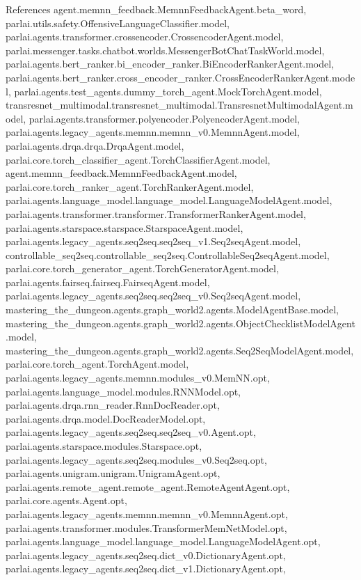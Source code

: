 References agent.\+memnn\+\_\+feedback.\+Memnn\+Feedback\+Agent.\+beta\+\_\+word, parlai.\+utils.\+safety.\+Offensive\+Language\+Classifier.\+model, parlai.\+agents.\+transformer.\+crossencoder.\+Crossencoder\+Agent.\+model, parlai.\+messenger.\+tasks.\+chatbot.\+worlds.\+Messenger\+Bot\+Chat\+Task\+World.\+model, parlai.\+agents.\+bert\+\_\+ranker.\+bi\+\_\+encoder\+\_\+ranker.\+Bi\+Encoder\+Ranker\+Agent.\+model, parlai.\+agents.\+bert\+\_\+ranker.\+cross\+\_\+encoder\+\_\+ranker.\+Cross\+Encoder\+Ranker\+Agent.\+model, parlai.\+agents.\+test\+\_\+agents.\+dummy\+\_\+torch\+\_\+agent.\+Mock\+Torch\+Agent.\+model, transresnet\+\_\+multimodal.\+transresnet\+\_\+multimodal.\+Transresnet\+Multimodal\+Agent.\+model, parlai.\+agents.\+transformer.\+polyencoder.\+Polyencoder\+Agent.\+model, parlai.\+agents.\+legacy\+\_\+agents.\+memnn.\+memnn\+\_\+v0.\+Memnn\+Agent.\+model, parlai.\+agents.\+drqa.\+drqa.\+Drqa\+Agent.\+model, parlai.\+core.\+torch\+\_\+classifier\+\_\+agent.\+Torch\+Classifier\+Agent.\+model, agent.\+memnn\+\_\+feedback.\+Memnn\+Feedback\+Agent.\+model, parlai.\+core.\+torch\+\_\+ranker\+\_\+agent.\+Torch\+Ranker\+Agent.\+model, parlai.\+agents.\+language\+\_\+model.\+language\+\_\+model.\+Language\+Model\+Agent.\+model, parlai.\+agents.\+transformer.\+transformer.\+Transformer\+Ranker\+Agent.\+model, parlai.\+agents.\+starspace.\+starspace.\+Starspace\+Agent.\+model, parlai.\+agents.\+legacy\+\_\+agents.\+seq2seq.\+seq2seq\+\_\+v1.\+Seq2seq\+Agent.\+model, controllable\+\_\+seq2seq.\+controllable\+\_\+seq2seq.\+Controllable\+Seq2seq\+Agent.\+model, parlai.\+core.\+torch\+\_\+generator\+\_\+agent.\+Torch\+Generator\+Agent.\+model, parlai.\+agents.\+fairseq.\+fairseq.\+Fairseq\+Agent.\+model, parlai.\+agents.\+legacy\+\_\+agents.\+seq2seq.\+seq2seq\+\_\+v0.\+Seq2seq\+Agent.\+model, mastering\+\_\+the\+\_\+dungeon.\+agents.\+graph\+\_\+world2.\+agents.\+Model\+Agent\+Base.\+model, mastering\+\_\+the\+\_\+dungeon.\+agents.\+graph\+\_\+world2.\+agents.\+Object\+Checklist\+Model\+Agent.\+model, mastering\+\_\+the\+\_\+dungeon.\+agents.\+graph\+\_\+world2.\+agents.\+Seq2\+Seq\+Model\+Agent.\+model, parlai.\+core.\+torch\+\_\+agent.\+Torch\+Agent.\+model, parlai.\+agents.\+legacy\+\_\+agents.\+memnn.\+modules\+\_\+v0.\+Mem\+N\+N.\+opt, parlai.\+agents.\+language\+\_\+model.\+modules.\+R\+N\+N\+Model.\+opt, parlai.\+agents.\+drqa.\+rnn\+\_\+reader.\+Rnn\+Doc\+Reader.\+opt, parlai.\+agents.\+drqa.\+model.\+Doc\+Reader\+Model.\+opt, parlai.\+agents.\+legacy\+\_\+agents.\+seq2seq.\+seq2seq\+\_\+v0.\+Agent.\+opt, parlai.\+agents.\+starspace.\+modules.\+Starspace.\+opt, parlai.\+agents.\+legacy\+\_\+agents.\+seq2seq.\+modules\+\_\+v0.\+Seq2seq.\+opt, parlai.\+agents.\+unigram.\+unigram.\+Unigram\+Agent.\+opt, parlai.\+agents.\+remote\+\_\+agent.\+remote\+\_\+agent.\+Remote\+Agent\+Agent.\+opt, parlai.\+core.\+agents.\+Agent.\+opt, parlai.\+agents.\+legacy\+\_\+agents.\+memnn.\+memnn\+\_\+v0.\+Memnn\+Agent.\+opt, parlai.\+agents.\+transformer.\+modules.\+Transformer\+Mem\+Net\+Model.\+opt, parlai.\+agents.\+language\+\_\+model.\+language\+\_\+model.\+Language\+Model\+Agent.\+opt, parlai.\+agents.\+legacy\+\_\+agents.\+seq2seq.\+dict\+\_\+v0.\+Dictionary\+Agent.\+opt, parlai.\+agents.\+legacy\+\_\+agents.\+seq2seq.\+dict\+\_\+v1.\+Dictionary\+Agent.\+opt, 